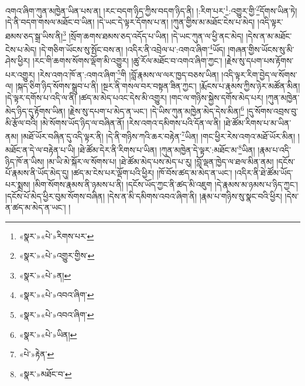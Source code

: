 འགའ་ཞིག་ཀུན་མཁྱེན་ཡིན་པས་ན། །རང་བདག་ཉིད་ཀྱིས་བདག་ཉིད་ནི། །:རིག་པར་\footnote{«སྣར་»«པེ་»རིགས་པར་}:འགྱུར་གྱི་\footnote{«སྣར་»«པེ་»འགྱུར་གྱིས་}དོགས་ཡིན་ཏེ། །དེ་ནི་བདག་གསལ་མཐོང་བ་ཡིན། །དེ་ཡང་དེ་ལྟར་དོགས་པ་ན། །ཀུན་གྱིས་མ་མཐོང་ངེས་པ་མེད། །འདི་ལྟར་ཐམས་ཅད་སྒྲ་ཡིས་ནི།\footnote{«སྣར་»«པེ་»ན།} །སྲོག་ཆགས་ཐམས་ཅད་འདོད་པ་ཡིན། །དེ་ཡང་ཀུན་ལ་ཕྱི་ནང་མེད། །དེས་ན་མ་མཐོང་ངེས་པ་མེད། །དེ་གཅིག་ཡོངས་སུ་སྤོང་བས་ན། །འདིར་ནི་འབྲེལ་པ་:འགའ་ཞིག་\footnote{«སྣར་»«པེ་»འབའ་ཞིག་}ཡོད། །གཞན་གྱིས་ཡོངས་སུ་མི་ཤེས་ཕྱིར། །རང་གི་ཆགས་སོགས་ལྡོག་མི་འགྱུར། །ཚུ་རོལ་མཐོང་བ་འགའ་ཞིག་ཀྱང་། །རྗེས་སུ་དཔག་པས་རྟོགས་པར་འགྱུར། །རེས་འགའ་ཁོ་ན་:འགའ་ཞིག་\footnote{«སྣར་»«པེ་»འབའ་ཞིག་}གི །བློ་རྣམས་ལ་ལར་ཁྱད་བཅས་ཡིན། །འདི་ལྟར་རིག་བྱེད་ལ་སོགས་ལ། །སྐད་ཅིག་ཉིད་སོགས་སྒྲུབ་པ་ནི། །སྔར་ནི་གསལ་བར་བསྟན་ཟིན་ཀྱང་། །རྨོངས་པ་རྣམས་ཀྱིས་ཉེར་མཚོན་མིན། །དེ་ལྟར་དགོས་པ་འདི་ལ་ནི། །ཚད་མ་མེད་པའང་དེས་མི་འགྱུར། །གང་ལ་གཉིས་སྐྱེས་དགོས་མེད་པར། །ཀུན་མཁྱེན་མེད་ཉིད་དུ་རྟོགས་ཡིན། །རྗེས་སུ་དཔག་པ་མེད་ན་ཡང་། །དེ་ཡིས་ཀུན་མཁྱེན་མེད་དེས་མིན།\footnote{«སྣར་»«པེ་»ཡིན།} །དུ་སོགས་འབྲས་བུ་མི་རྩོལ་བའི། །མེ་སོགས་ཡོད་ཉིད་ལ་བཞིན་ནོ། །རེས་འགའ་དམིགས་པའི་དོན་ལ་ནི། །ཐེ་ཚོམ་རིགས་པ་མ་ཡིན་ནམ། །མཐོ་ཡོར་བཞིན་དུ་འདི་ལྟར་ནི། །དེ་ནི་གཉིས་ཀའི་ཆར་བརྟེན་\footnote{«པེ་»རྟེན་}ཡིན། །གང་ཕྱིར་རེས་འགའ་མཐོ་ཡོར་མིན། །མཐོང་ན་དེ་ལ་བརྟེན་པ་ཡི། །ཐེ་ཚོམ་དེར་ནི་རིགས་པ་ཡིན། །ཀུན་མཁྱེན་དེ་ལྟར་:མཐོང་མ་\footnote{«སྣར་»མཐོང་བ་}ཡིན། །རྣམ་པ་འདི་ཉིད་ཁོ་ན་ཡིས། །མ་ཡི་མེ་སྐོར་ལ་སོགས་པ། །ཐེ་ཚོམ་མེད་པས་མེད་པ་རུ། །བློ་ལྡན་ཁྱེད་ལ་ཐལ་མིན་ནམ། །དངོས་པོ་རྣམས་ནི་ཡོད་མེད་དུ། །ཚད་མ་ངེས་པར་ལྡོག་པའི་ཕྱིར། །ཁོ་བོས་ཚད་མ་མེད་ན་ཡང་། །འདིར་ནི་ཐེ་ཚོམ་ཡོད་པར་སྨྲས། །མིག་སོགས་རྣམས་ནི་ཉམས་པ་ནི། །དངོས་ཡོད་ཀྱང་ནི་ཚད་མི་འཇུག །དེ་རྣམས་མ་ཉམས་པ་ཉིད་ཀྱང་། །དངོས་པོ་མེད་ཕྱིར་བུམ་སོགས་བཞིན། །དེས་ན་མི་དམིགས་འབའ་ཞིག་ནི། །རྣམ་པ་གཉིས་སུ་སྣང་བའི་ཕྱིར། །དེས་ན་ཚད་མ་མེད་ན་ཡང་། །

